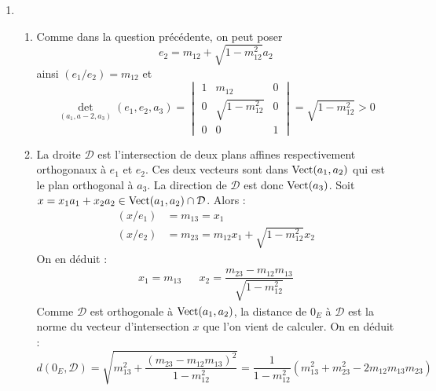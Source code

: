 \begin{enumerate}
\item \begin{enumerate}
 \item Comme dans la question précédente, on peut poser
\begin{displaymath}
 e_2 = m_{12} + \sqrt{1-m_{12}^2}a_2
\end{displaymath}
ainsi $(e_1/e_2)=m_{12}$ et 
\begin{displaymath}
 \det_{(a_1,a-2,a_3)}(e_1,e_2,a_3)=
\begin{vmatrix}
 1 & m_{12} & 0 \\
 0 & \sqrt{1-m_{12}^2} & 0 \\
0 & 0 & 1
\end{vmatrix}
= \sqrt{1-m_{12}^2} >0
\end{displaymath}

\item La droite $\mathcal D$ est l'intersection de deux plans affines respectivement orthogonaux à $e_1$ et $e_2$. Ces deux vecteurs sont dans $\operatorname{Vect}(a_1,a_2)$ qui est le plan orthogonal à $a_3$. La direction de $\mathcal D$ est donc $\operatorname{Vect}(a_3)$.\newline
Soit $x=x_1a_1+x_2a_2\in \operatorname{Vect}(a_1,a_2)\cap \mathcal D$. Alors :
\begin{align*}
 (x/e_1) &= m_{13} = x_1 \\
 (x/e_2) &= m_{23} = m_{12}x_1 +\sqrt{1-m_{12}^2} x_2
\end{align*}
On en déduit :
\begin{align*}
 x_1=m_{13} & & x_2 = \dfrac{m_{23}-m_{12}m_{13}}{\sqrt{1-m_{12}^2}}
\end{align*}
Comme $\mathcal D$ est orthogonale à $\operatorname{Vect}(a_1,a_2)$, la distance de $0_E$ à $\mathcal D$ est la norme du vecteur d'intersection $x$ que l'on vient de calculer. On en déduit :
\begin{displaymath}
 d(0_E,\mathcal D) =
\sqrt{m_{13}^2+\dfrac{(m_{23}-m_{12}m_{13})^2}{1-m_{12}^2}} 
= \dfrac{1}{1-m_{12}^2}\left( m_{13}^2+m_{23}^2-2m_{12}m_{13}m_{23}\right) 
\end{displaymath}


\end{enumerate}
\end{enumerate}
